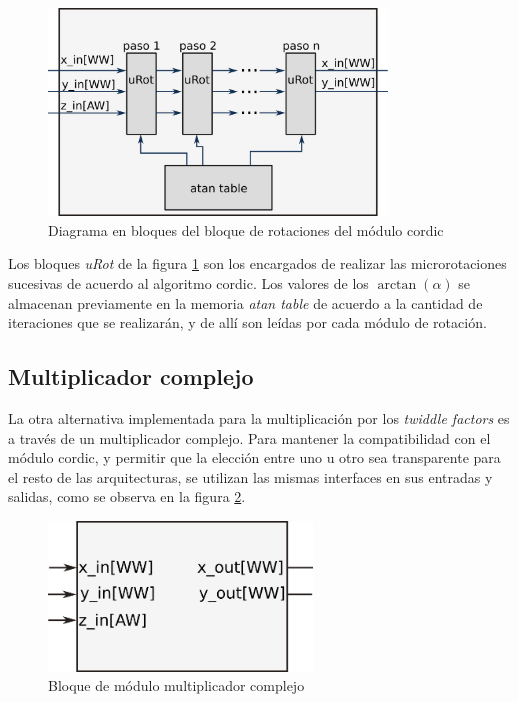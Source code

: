 \begin{figure}[htb!]
        \centering
        \includegraphics[width=9cm]{./figures/uCordicBlocks.png}
        \caption{Diagrama en bloques del bloque de rotaciones del módulo cordic}
        \label{fig:uCordicBlocks}
\end{figure}

Los bloques \textit{uRot} de la figura \ref{fig:uCordicBlocks} son los encargados de realizar las
microrotaciones sucesivas de acuerdo al algoritmo cordic. Los valores de los $\arctan(\alpha)$ se
almacenan previamente en la memoria \textit{atan table} de acuerdo a la cantidad de iteraciones que
se realizarán, y de allí son leídas por cada módulo de rotación.

\subsection{Multiplicador complejo}

La otra alternativa implementada para la multiplicación por los \textit{twiddle factors} es a través
de un multiplicador complejo. Para mantener la compatibilidad con el módulo cordic, y permitir que
la elección entre uno u otro sea transparente para el resto de las arquitecturas, se utilizan las
mismas interfaces en sus entradas y salidas, como se observa en la figura \ref{fig:multDiam}.

\begin{figure}[htb!]
        \centering
        \includegraphics[width=7cm]{./figures/cordicDiam.png}
        \caption{Bloque de módulo multiplicador complejo}
        \label{fig:multDiam}
\end{figure}

